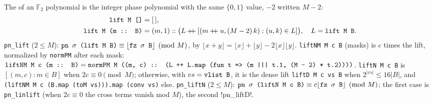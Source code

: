 \begin{definition}[Lift]\label{def:lean-pathsum-lift}
The  of an $\mathbb F_2$ polynomial is the integer phase polynomial with the same
$\{0,1\}$ value, $-2$ written $M-2$:
\begin{align*}
\textnormal{\texttt{lift M []}} &= [\,],\\
\textnormal{\texttt{lift M (\allowbreak{}m :: B)}} &= (m,1) :: \bigl(L \mathbin{+\!\!+} [(m\mathbin{+\!\!+}u, (M-2)\,k) : (u,k)\in L]\bigr),\quad L=\textnormal{\texttt{lift M B}}.
\end{align*}
\textnormal{\texttt{pn\_\allowbreak{}lift}} ($2\le M$): $\textnormal{\texttt{pn \ensuremath{\sigma} (\allowbreak{}lift M B)}}\equiv\lfloor\textnormal{\texttt{fz \ensuremath{\sigma} B}}\rfloor\pmod M$, by
$\lfloor x+y\rfloor = \lfloor x\rfloor+\lfloor y\rfloor-2\lfloor x\rfloor\lfloor y\rfloor$.
\textnormal{\texttt{liftNM M c B}} (masks) is $c$ times the lift, normalized by \textnormal{\texttt{normPM}} after each mask:
$\textnormal{\texttt{liftNM M c (\allowbreak{}m :: B)}} = \textnormal{\texttt{normPM M (\allowbreak{}(\allowbreak{}m,\allowbreak{} c) :: (\allowbreak{}L ++ L.\allowbreak{}map (\allowbreak{}fun t => (\allowbreak{}m ||| t.\allowbreak{}1,\allowbreak{} (\allowbreak{}M -{} 2) * t.\allowbreak{}2))))}}$.
\textnormal{\texttt{liftN M c B}} is $[(m,c): m\in B]$ when $2c\equiv 0\pmod M$; otherwise, with
$vs=\textnormal{\texttt{vlist B}}$, it is the dense lift \textnormal{\texttt{liftD M c vs B}} when
$2^{|vs|}\le16|B|$, and
\textnormal{\texttt{(\allowbreak{}liftNM M c (\allowbreak{}B.\allowbreak{}map (\allowbreak{}toM vs))).\allowbreak{}map (\allowbreak{}conv vs)}} else.
\textnormal{\texttt{pn\_\allowbreak{}liftN}} ($2\le M$): $\textnormal{\texttt{pn \ensuremath{\sigma} (\allowbreak{}liftN M c B)}}\equiv c\lfloor\textnormal{\texttt{fz \ensuremath{\sigma} B}}\rfloor\pmod M$;
the first case is \textnormal{\texttt{pn\_\allowbreak{}linlift}} (when $2c\equiv0$ the cross terms vanish mod $M$),
the second \lean!pn_liftD!.
\end{definition}


